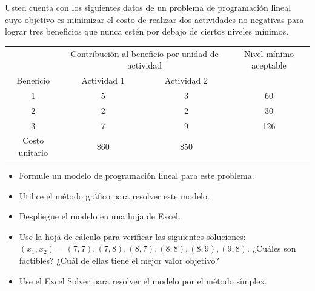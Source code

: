 \begin{Ejer} Usted cuenta con los siguientes datos de un problema de programaci\'on lineal cuyo objetivo es minimizar el costo de realizar dos actividades no negativas para lograr tres beneficios que nunca est\'en por debajo de ciertos niveles m\'inimos.

\begin{center}
\begin{tabular}{c|cc|c}
\hline
 & \multicolumn{2}{c|}{Contribuci\'on al beneficio por unidad de actividad} & Nivel m\'inimo aceptable \\
Beneficio & Actividad 1 & Actividad 2 &  \\
\hline
1 & 5 & 3 & 60 \\
2 & 2 & 2 & 30 \\
3 & 7 & 9 & 126 \\
\hline
Costo unitario & \$60 & \$50 &  \\
\hline
\end{tabular}
\end{center}

\begin{itemize}
\item[a)] Formule un modelo de programaci\'on lineal para este problema.
\item[b)] Utilice el m\'etodo gr\'afico para resolver este modelo.
\item[c)] Despliegue el modelo en una hoja de Excel.
\item[d)] Use la hoja de c\'alculo para verificar las siguientes soluciones:
$(x_1,x_2)=(7,7),(7,8),(8,7),(8,8),(8,9),(9,8)$.
¿Cu\'ales son factibles? ¿Cu\'al de ellas tiene el mejor valor objetivo?
\item[e)] Use el Excel Solver para resolver el modelo por el m\'etodo s\'implex.
\end{itemize}


\end{Ejer}


